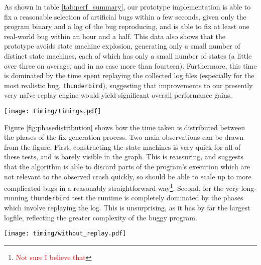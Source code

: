 \documentclass[10pt,twocolumn,preprint,natbib,authoryear]{sigplanconf}
\newcommand{\editorial}[1]{\textcolor{red}{\footnote{\textcolor{red}{#1}}}}
\begin{document}
As shown in table \ref{tab:perf_summary}, our prototype implementation
is able to fix a reasonable selection of artificial bugs within a few
seconds, given only the program binary and a log of the bug
reproducing, and is able to fix at least one real-world bug within an
hour and a half.  This data also shows that the prototype avoids state
machine explosion, generating only a small number of distinct state
machines, each of which has only a small number of states (a little
over three on average, and in no case more than fourteen).
Furthermore, this time is dominated by the time spent replaying the
collected log files (especially for the most realistic bug,
\verb|thunderbird|), suggesting that improvements to our presently
very na\"ive replay engine would yield significant overall performance
gains.

\begin{figure*}
\texttt{[image: timing/timings.pdf]}
\caption{Breakdown of how long the various phases take, as fractions
  of the entire fix-generating process.  Mean and standard deviation
  from five runs on a single log file for each bug.}
\label{fig:phasedistribution}
\end{figure*}

Figure \ref{fig:phasedistribution} shows how the time taken is
distributed between the phases of the fix generation process.  Two
main observations can be drawn from the figure.  First, constructing
the state machines is very quick for all of these tests, and is barely
visible in the graph.  This is reassuring, and suggests that the
algorithm is able to discard parts of the program's execution which
are not relevant to the observed crash quickly, so should be able to
scale up to more complicated bugs in a reasonably straightforward
way\editorial{Not sure I believe that}.  Second, for the very
long-running \verb|thunderbird| test the runtime is completely
dominated by the phases which involve replaying the log.  This is
unsurprising, as it has by far the largest logfile, reflecting the
greater complexity of the buggy program.

\begin{figure*}
\texttt{[image: timing/without\_replay.pdf]}
\caption{Break down of how long the phases take, ignoring time spent
  in the replay engine.  Mean and standard deviation from five runs on
  a single log file for each bug.}
\label{fig:timesignoringreplay}
\end{figure*}
\end{document}

